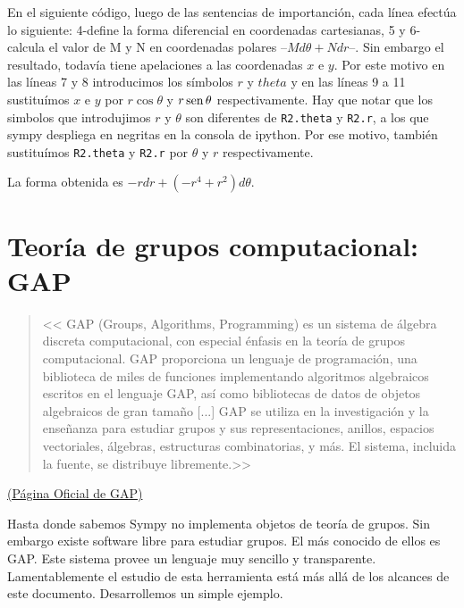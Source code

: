 \begin{subappendices}
En el siguiente código, luego de las sentencias de importanción, cada línea efectúa lo siguiente: 4-define la forma diferencial en coordenadas cartesianas, 5 y 6-calcula el valor de M y N en coordenadas polares --$Md\theta+N dr$--. Sin embargo el resultado, todavía tiene apelaciones a las coordenadas $x$ e $y$. Por este motivo en las líneas 7 y 8 introducimos los símbolos $r$ y $theta$ y en las líneas 9 a 11 sustituímos $x$ e $y$ por $r\cos\theta$ y $r\operatorname{sen}\theta$ respectivamente. Hay que notar que los simbolos que introdujimos $r$ y $\theta$ son diferentes de \texttt{R2.theta} y \texttt{R2.r}, a los que sympy despliega en negritas en la consola de ipython.  Por ese motivo, también sustituímos   \texttt{R2.theta} y \texttt{R2.r} por $\theta$ y $r$ respectivamente.

 

La forma obtenida es $-rdr+(-r^4+r^2)d\theta$.




\section{Teoría de grupos computacional: GAP}


\begin{quote}
 <<
GAP (Groups, Algorithms, Programming) es un sistema de álgebra discreta computacional, con especial énfasis en la teoría de grupos computacional. GAP proporciona un lenguaje de programación, una biblioteca de miles de funciones implementando algoritmos algebraicos escritos en el lenguaje GAP, así como bibliotecas de datos de objetos algebraicos de gran tamaño [...] GAP se utiliza en la investigación y la enseñanza para estudiar grupos y sus representaciones, anillos, espacios vectoriales, álgebras, estructuras combinatorias, y más. El sistema, incluida la fuente, se distribuye libremente.>>
\end{quote}
\begin{flushright}
 \href{https://www.gap-system.org/}{(Página Oficial de GAP)} 
\end{flushright}

Hasta donde sabemos Sympy no implementa objetos de teoría de grupos. Sin embargo existe software libre para estudiar grupos. El más conocido de ellos es GAP. Este sistema provee un lenguaje muy sencillo y transparente. Lamentablemente el estudio de esta herramienta está más allá de los alcances de este documento. Desarrollemos un simple ejemplo.


\end{subappendices}
